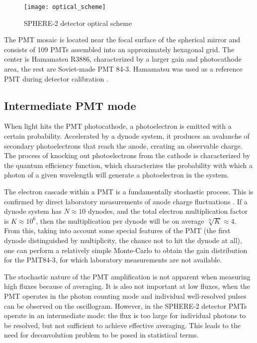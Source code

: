 \begin{figure}
	\centering
	\texttt{[image: optical\_scheme]}
	\caption{SPHERE-2 detector optical scheme}
	\label{pic:sphere-detector-optical-scheme}
\end{figure}

The PMT mosaic is located near the focal surface of the spherical mirror and consists of 109 PMTs assembled into an approximately hexagonal grid. The center is Hamamatsu R3886, characterized by a larger gain and photocathode area, the rest are Soviet-made PMT 84-3. Hamamatsu was used as a reference PMT during detector calibration \cite{SphereCalibration2016}.

\subsection{Intermediate PMT mode}
\label{sec:photon-to-phels-conversion}

When light hits the PMT photocathode, a photoelectron is emitted with a certain probability. Accelerated by a dynode system, it produces an avalanche of secondary photoelectrons that reach the anode, creating an observable charge. The process of knocking out photoelectrons from the cathode is characterized by the quantum efficiency function, which characterizes the probability with which a photon of a given wavelength will generate a photoelectron in the system.

The electron cascade within a PMT is a fundamentally stochastic process. This is confirmed by direct laboratory measurements of anode charge fluctuations \cite[Fig. 9]{SphereCalibration2016}. If a dynode system has $N \approx 10$ dynodes, and the total electron multiplication factor is $K \approx 10^6$, then the multiplication per dynode will be on average $\sqrt[N]{K} \approx 4$. From this, taking into account some special features of the PMT (the first dynode distinguished by multiplicity, the chance not to hit the dynode at all), one can perform a relatively simple Monte-Carlo to obtain the gain distribution for the PMT84-3, for which laboratory measurements are not available.

The stochastic nature of the PMT amplification is not apparent when measuring high fluxes because of averaging. It is also not important at low fluxes, when the PMT operates in the photon counting mode and individual well-resolved pulses can be observed on the oscillogram. However, in the SPHERE-2 detector PMTs operate in an intermediate mode: the flux is too large for individual photons to be resolved, but not sufficient to achieve effective averaging. This leads to the need for deconvolution problem to be posed in statistical terms.